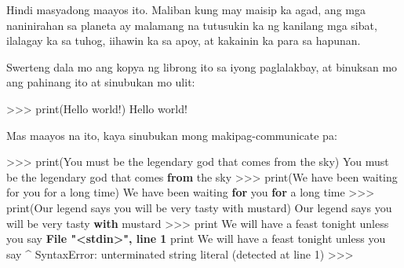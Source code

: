\documentclass[10pt,]{book}
\newenvironment{Shaded}{}{}
\newcommand{\BuiltInTok}[1]{\textcolor[rgb]{0.00,0.50,0.00}{#1}}
\newcommand{\ControlFlowTok}[1]{\textcolor[rgb]{0.00,0.44,0.13}{\textbf{#1}}}
\newcommand{\DecValTok}[1]{\textcolor[rgb]{0.25,0.63,0.44}{#1}}
\newcommand{\ErrorTok}[1]{\textcolor[rgb]{1.00,0.00,0.00}{\textbf{#1}}}
\newcommand{\ImportTok}[1]{\textcolor[rgb]{0.00,0.50,0.00}{\textbf{#1}}}
\newcommand{\NormalTok}[1]{#1}
\newcommand{\OperatorTok}[1]{\textcolor[rgb]{0.40,0.40,0.40}{#1}}
\newcommand{\PreprocessorTok}[1]{\textcolor[rgb]{0.74,0.48,0.00}{#1}}
\newcommand{\StringTok}[1]{\textcolor[rgb]{0.25,0.44,0.63}{#1}}
\begin{document}
Hindi masyadong maayos ito. Maliban kung may maisip ka agad, ang mga
naninirahan sa planeta ay malamang na tutusukin ka ng kanilang mga
sibat, ilalagay ka sa tuhog, iihawin ka sa apoy, at kakainin ka para sa
hapunan.

Swerteng dala mo ang kopya ng librong ito sa iyong paglalakbay, at
binuksan mo ang pahinang ito at sinubukan mo ulit:

\begin{Shaded}
\begin{Highlighting}[]
\OperatorTok{\textgreater{}\textgreater{}\textgreater{}} \BuiltInTok{print}\NormalTok{(}\StringTok{\textquotesingle{}Hello world!\textquotesingle{}}\NormalTok{)}
\NormalTok{Hello world}\OperatorTok{!}
\end{Highlighting}
\end{Shaded}

Mas maayos na ito, kaya sinubukan mong makipag-communicate pa:

\begin{Shaded}
\begin{Highlighting}[]
\OperatorTok{\textgreater{}\textgreater{}\textgreater{}} \BuiltInTok{print}\NormalTok{(}\StringTok{\textquotesingle{}You must be the legendary god that comes from the sky\textquotesingle{}}\NormalTok{)}
\NormalTok{You must be the legendary god that comes }\ImportTok{from}\NormalTok{ the sky}
\OperatorTok{\textgreater{}\textgreater{}\textgreater{}} \BuiltInTok{print}\NormalTok{(}\StringTok{\textquotesingle{}We have been waiting for you for a long time\textquotesingle{}}\NormalTok{)}
\NormalTok{We have been waiting }\ControlFlowTok{for}\NormalTok{ you }\ControlFlowTok{for}\NormalTok{ a }\BuiltInTok{long}\NormalTok{ time}
\OperatorTok{\textgreater{}\textgreater{}\textgreater{}} \BuiltInTok{print}\NormalTok{(}\StringTok{\textquotesingle{}Our legend says you will be very tasty with mustard\textquotesingle{}}\NormalTok{)}
\NormalTok{Our legend says you will be very tasty }\ControlFlowTok{with}\NormalTok{ mustard}
\OperatorTok{\textgreater{}\textgreater{}\textgreater{}} \BuiltInTok{print} \StringTok{\textquotesingle{}We will have a feast tonight unless you say}
\ErrorTok{  File "\textless{}stdin\textgreater{}", line 1}
    \BuiltInTok{print} \StringTok{\textquotesingle{}We will have a feast tonight unless you say}
\ErrorTok{          \^{}}
\PreprocessorTok{SyntaxError}\NormalTok{: unterminated string literal (detected at line }\DecValTok{1}\NormalTok{)}
\OperatorTok{\textgreater{}\textgreater{}\textgreater{}}
\end{Highlighting}
\end{Shaded}
\end{document}

